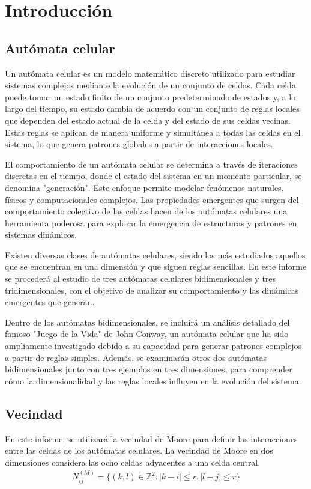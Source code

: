 \section{Introducción}
\label{sec:intro}

\subsection{Autómata celular}
\label{subsec:ac}

Un autómata celular es un modelo matemático discreto utilizado para estudiar sistemas complejos mediante la evolución de un conjunto de celdas.
Cada celda puede tomar un estado finito de un conjunto predeterminado de estados y, a lo largo del tiempo, su estado cambia de acuerdo con un conjunto de reglas locales que dependen del estado actual de la celda y del estado de sus celdas vecinas.
Estas reglas se aplican de manera uniforme y simultánea a todas las celdas en el sistema, lo que genera patrones globales a partir de interacciones locales.

El comportamiento de un autómata celular se determina a través de iteraciones discretas en el tiempo, donde el estado del sistema en un momento particular, se denomina "generación".
Este enfoque permite modelar fenómenos naturales, físicos y computacionales complejos.
Las propiedades emergentes que surgen del comportamiento colectivo de las celdas hacen de los autómatas celulares una herramienta poderosa para explorar la emergencia de estructuras y patrones en sistemas dinámicos.

Existen diversas clases de autómatas celulares, siendo los más estudiados aquellos que se encuentran en una dimensión y que siguen reglas sencillas.
En este informe se procederá al estudio de tres autómatas celulares bidimensionales y tres tridimensionales, con el objetivo de analizar su comportamiento y las dinámicas emergentes que generan.

Dentro de los autómatas bidimensionales, se incluirá un análisis detallado del famoso "Juego de la Vida" de John Conway, un autómata celular que ha sido ampliamente investigado debido a su capacidad para generar patrones complejos a partir de reglas simples.
Además, se examinarán otros dos autómatas bidimensionales junto con tres ejemplos en tres dimensiones, para comprender cómo la dimensionalidad y las reglas locales influyen en la evolución del sistema.

\subsection{Vecindad}
\label{subsec:vecindad}
En este informe, se utilizará la vecindad de Moore para definir las interacciones entre las celdas de los autómatas celulares.
La vecindad de Moore en dos dimensiones considera las ocho celdas adyacentes a una celda central.
\begin{equation}
    \label{eq:moore_neighborhood}
    \begin{aligned}
        N^{(M)}_{ij} = \{(k,l) \in \mathbb{Z}^2 : |k-i| \leq r, |l-j| \leq r\}
    \end{aligned}
\end{equation}

